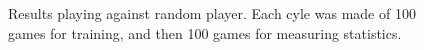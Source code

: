 \begin{figure}[!htb]
\centering
{}


\caption{Results playing against random player. Each cyle was made of 100 games for training, and then 100 games for measuring statistics.
\label{fig:ttt-results-random}
}
\end{figure}

